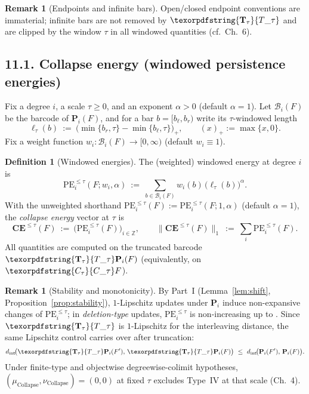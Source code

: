 \documentclass[11pt]{article}
\DeclareRobustCommand{\hyp}{\nobreakdash-}
\numberwithin{equation}{section}
\theoremstyle{definition}
\newtheorem{definition}[theorem]{Definition}
\newtheorem{remark}[theorem]{Remark}
\DeclareRobustCommand{\Ttau}{\texorpdfstring{\ensuremath{\mathbf{T}_{\tau}}}{T\_\tau}}
\DeclareRobustCommand{\Ctau}{\texorpdfstring{\ensuremath{C_{\tau}}}{C\_\tau}}
\DeclareRobustCommand{\muc}{\mu_{\mathrm{Collapse}}}
\DeclareRobustCommand{\nuc}{\nu_{\mathrm{Collapse}}}
\DeclareRobustCommand{\fqi}{\text{f.q.i.}}
\begin{document}
\begin{remark}[Endpoints and infinite bars]\label{rk:11-endpoints}
Open/closed endpoint conventions are immaterial; infinite bars are not removed by $\Ttau$ and are clipped by the window $\tau$ in all windowed quantities (cf.\ Ch.~6).
\end{remark}

\subsection*{11.1. Collapse energy (windowed persistence energies)}
Fix a degree $i$, a scale $\tau\ge 0$, and an exponent $\alpha>0$ (default $\alpha=1$). Let $\mathcal{B}_{i}(F)$ be the barcode of $\mathbf{P}_i(F)$, and for a bar $b=[b_{\ell},b_{r})$ write its $\tau$-windowed length
\[
  \ell_{\tau}(b)\ :=\ \bigl(\min\{b_{r},\tau\}-\min\{b_{\ell},\tau\}\bigr)_{+},\qquad (x)_{+}:=\max\{x,0\}.
\]
Fix a weight function $w_i:\mathcal{B}_i(F)\to[0,\infty)$ (default $w_i\equiv 1$).
\begin{definition}[Windowed energies]\label{def:11-PE}
The (weighted) windowed energy at degree $i$ is
\[
  \mathrm{PE}_{i}^{\le \tau}(F;w_i,\alpha)\ :=\ \sum_{b\in \mathcal{B}_{i}(F)} w_i(b)\,\big(\ell_{\tau}(b)\big)^{\alpha}.
\]
With the unweighted shorthand $\mathrm{PE}_{i}^{\le \tau}(F):=\mathrm{PE}_{i}^{\le \tau}(F;1,\alpha)$ (default $\alpha=1$), the \emph{collapse energy} vector at $\tau$ is
\[
  \mathbf{CE}^{\le \tau}(F)\ :=\ \big(\mathrm{PE}_{i}^{\le \tau}(F)\big)_{i\in\mathbb{Z}},\qquad \|\mathbf{CE}^{\le \tau}(F)\|_{1}\ :=\ \sum_{i}\mathrm{PE}_{i}^{\le \tau}(F).
\]
All quantities are computed on the truncated barcode $\Ttau\mathbf{P}_i(F)$ (equivalently, on $\Ctau F$).
\end{definition}

\begin{remark}[Stability and monotonicity]
By Part~I (Lemma~\ref{lem:shift}, Proposition~\ref{prop:stability}), $1$-Lipschitz updates under $\mathbf{P}_i$ induce non\hyp expansive changes of $\mathrm{PE}_{i}^{\le \tau}$; in \emph{deletion\hyp type} updates, $\mathrm{PE}_{i}^{\le \tau}$ is non\hyp increasing up to \fqi.
Since $\Ttau$ is $1$-Lipschitz for the interleaving distance, the same Lipschitz control carries over after truncation:
\[
  d_{\mathrm{int}}\!\big(\Ttau\mathbf{P}_i(F'),\,\Ttau\mathbf{P}_i(F)\big)\ \le\ d_{\mathrm{int}}\!\big(\mathbf{P}_i(F'),\,\mathbf{P}_i(F)\big).
\]
Under finite-type and objectwise degreewise-colimit hypotheses, $(\muc,\nuc)=(0,0)$ at fixed $\tau$ excludes Type~IV at that scale (Ch.~4).
\end{remark}
\end{document}

